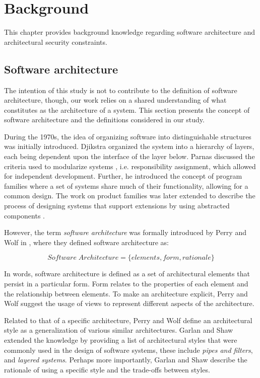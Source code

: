 \chapter{Background}

This chapter provides background knowledge regarding software architecture and architectural security constraints. 

\section{Software architecture}
The intention of this study is not to contribute to the definition of software architecture, though, our work relies on a shared understanding of what constitutes as the architecture of a system. This section presents the concept of software architecture and the definitions considered in our study.   

During the 1970s,  the idea of organizing software into distinguishable structures was initially introduced. Djikstra \cite{dijkstra_structure_1968} organized the system into a hierarchy of layers, each being dependent upon the interface of the layer below. Parnas discussed the criteria used to modularize systems \cite{broy_criteria_1972}, i.e. responsibility assignment, which allowed for independent development. Further, he introduced the concept of program families \cite{parnas_design_1976} where a set of systems share much of their functionality, allowing for a common design. The work on product families was later extended to describe the process of designing systems that support extensions by using abstracted components \cite{parnas_designing_1979}. 

However, the term \textit{software architecture} was formally introduced by Perry and Wolf in \cite{perry_foundations_1992}, where they defined software architecture as:

\[ Software \;  Architecture = \{elements,form,rationale\} \]

In words, software architecture is defined as a set of architectural elements that persist in a particular form. Form relates to the properties of each element and the relationship between elements. To make an architecture explicit, Perry and Wolf \cite{perry_foundations_1992} suggest the usage of views to represent different aspects of the architecture. 

Related to that of a specific architecture, Perry and Wolf \cite{perry_foundations_1992} define an architectural style as a generalization of various similar architectures. Garlan and Shaw \cite{ambriola_introduction_1993} extended the knowledge by providing a list of architectural styles that were commonly used in the design of software systems, these include \textit{pipes and filters}, and \textit{layered systems}. Perhaps more importantly, Garlan and Shaw \cite{ambriola_introduction_1993} describe the rationale of using a specific style and the trade-offs between styles.

